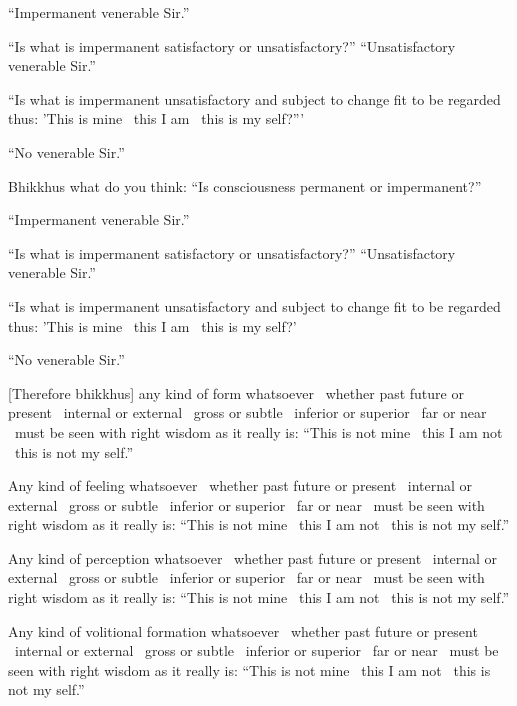 ``Impermanent venerable Sir.''

``Is what is impermanent satisfactory or unsatisfactory?'' ``Unsatisfactory venerable Sir.''

``Is what is impermanent unsatisfactory and subject to change fit to be regarded thus: 'This is mine \breathmark\ this I am \breathmark\ this is my self?'''

``No venerable Sir.''

Bhikkhus what do you think: ``Is consciousness permanent or impermanent?''

``Impermanent venerable Sir.''

``Is what is impermanent satisfactory or unsatisfactory?'' ``Unsatisfactory venerable Sir.''

``Is what is impermanent unsatisfactory and subject to change fit to be regarded thus: 'This is mine \breathmark\ this I am \breathmark\ this is my self?'

``No venerable Sir.''

[Therefore bhikkhus] any kind of form whatsoever \breathmark\ whether past future or present \breathmark\ internal or external \breathmark\ gross or subtle \breathmark\ inferior or superior \breathmark\ far or near \breathmark\ must be seen with right wisdom as it really is: ``This is not mine \breathmark\ this I am not \breathmark\ this is not my self.''

Any kind of feeling whatsoever \breathmark\ whether past future or present \breathmark\ internal or external \breathmark\ gross or subtle \breathmark\ inferior or superior \breathmark\ far or near \breathmark\ must be seen with right wisdom as it really is: ``This is not mine \breathmark\ this I am not \breathmark\ this is not my self.''

Any kind of perception whatsoever \breathmark\ whether past future or present \breathmark\ internal or external \breathmark\ gross or subtle \breathmark\ inferior or superior \breathmark\ far or near \breathmark\ must be seen with right wisdom as it really is: ``This is not mine \breathmark\ this I am not \breathmark\ this is not my self.''

Any kind of volitional formation whatsoever \breathmark\ whether past future or present \breathmark\ internal or external \breathmark\ gross or subtle \breathmark\ inferior or superior \breathmark\ far or near \breathmark\ must be seen with right wisdom as it really is: ``This is not mine \breathmark\ this I am not \breathmark\ this is not my self.''

